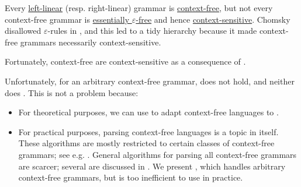 \begin{remark}\label{rem:chomsky_hierarchy_failure}
  Every \hyperref[def:chomsky_hierarchy/regular]{left-linear} (resp. right-linear) grammar is \hyperref[def:chomsky_hierarchy/context_free]{context-free}, but not every context-free grammar is \hyperref[def:epsilon_free_grammar]{essentially \( \varepsilon \)-free} and hence \hyperref[def:chomsky_hierarchy/context_sensitive]{context-sensitive}. Chomsky disallowed \( \varepsilon \)-rules in \cite[def. 6]{Chomsky1959}, and this led to a tidy hierarchy because it made context-free grammars necessarily context-sensitive.

  Fortunately, context-free  are context-sensitive as a consequence of .

  Unfortunately, for an arbitrary context-free grammar,  does not hold, and neither does . This is not a problem because:
  \begin{itemize}
    \item For theoretical purposes, we can use  to adapt context-free languages to .

    \item For practical purposes, parsing context-free languages is a topic in itself. These algorithms are mostly restricted to certain classes of context-free grammars; see e.g. \cite[ch. 6]{Salomaa1987}. General algorithms for parsing all context-free grammars are scarcer; several are discussed in \cite{Economopoulos2006}. We present , which handles arbitrary context-free grammars, but is too inefficient to use in practice.
  \end{itemize}
\end{remark}

